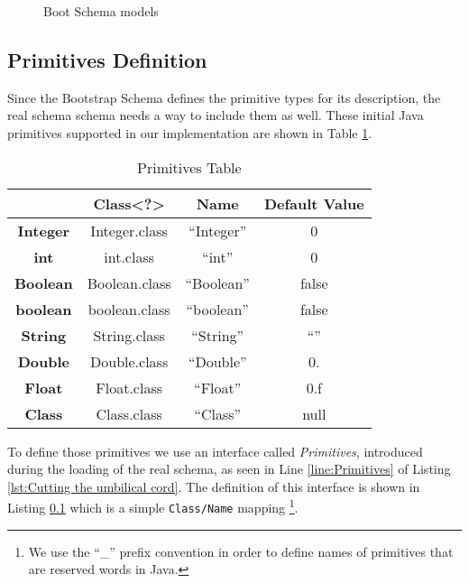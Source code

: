 \begin{figure}[H]
	\centering
  	\caption{Boot Schema models}
  	\label{fig:schema_schema_models}
\end{figure}

\subsection{Primitives Definition}\label{Primitives Definition}
Since the Bootstrap Schema defines the primitive types for its description, the real schema schema needs a way to include them as well.
These initial Java primitives supported in our implementation are shown in Table \ref{tbl:primivites_table}.

\begin{table}[H]
	\centering
	\begin{tabular}{c|ccc}
	\multicolumn{1}{l}{} & \textbf{Class\textless?\textgreater} & \textbf{Name} & \textbf{Default Value} \\ \midrule
	\textbf{Integer}     & Integer.class                        & ``Integer''   & 0                      \\
	\textbf{int}         & int.class                            & ``int''       & 0                      \\
	\textbf{Boolean}     & Boolean.class                        & ``Boolean''   & false                  \\
	\textbf{boolean}     & boolean.class                        & ``boolean''   & false                  \\
	\textbf{String}      & String.class                         & ``String''    & ``''                   \\
	\textbf{Double}      & Double.class                         & ``Double''    & 0.                     \\
	\textbf{Float}       & Float.class                          & ``Float''     & 0.f                    \\
	\textbf{Class}       & Class.class                          & ``Class''     & null 
	\end{tabular}
	\caption{Primitives Table}
	\label{tbl:primivites_table}
\end{table}

To define those primitives we use an interface called \textit{Primitives}, introduced during the loading of the real schema, as seen in Line \ref{line:Primitives} of Listing \ref{lst:Cutting the umbilical cord}.
The definition of this interface is shown in Listing \ref{Primitives Definition} which is a simple \texttt{Class/Name} mapping \footnote{We use the ``\_'' prefix convention in order to define names of primitives that are reserved words in Java.}. 


